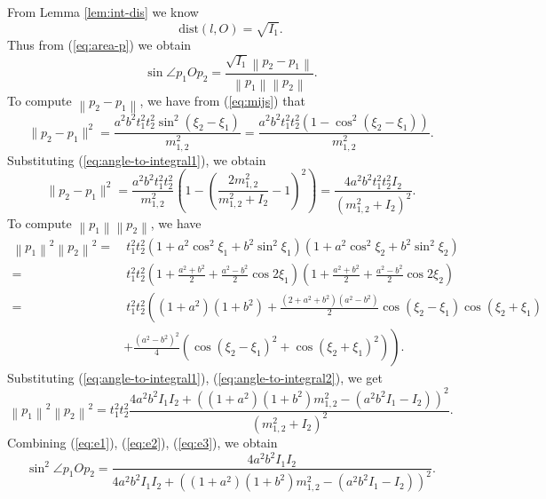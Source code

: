 \documentclass[12pt]{article}
\begin{document}
From Lemma \ref{lem:int-dis} we know 
$$
\text{dist}(l, O) = \sqrt{I_1}.
$$
Thus from (\ref{eq:area-p}) we obtain
\begin{equation}\label{eq:e1}
  \sin \angle p_1 O p_2 
 = \frac{\sqrt{I_1} \left\|p_2-p_1\right\| }{ \left\|p_1\right\| \left\| p_2\right\|}.
\end{equation}
To compute $\left\|p_2-p_1\right\|$,
we have from (\ref{eq:mijs}) that 
$$
\|p_2-p_1\|^2 = \frac{a^2 b^2 t_1^2 t_2^2 \sin^2\left(\xi_2 - \xi_1\right)}{m_{1,2}^2} = 
\frac{a^2 b^2 t_1^2 t_2^2 \left(1 - \cos^2\left(\xi_2 - \xi_1\right)\right)}{m_{1,2}^2}.
$$
Substituting (\ref{eq:angle-to-integral1}), we obtain
\begin{equation}\label{eq:e2}
\|p_2-p_1\|^2 = \frac{a^2 b^2 t_1^2 t_2^2}{m_{1,2}^2} \left( 1 - \left( \frac{2 m_{1,2}^2}{m_{1,2}^2 + I_2} - 1 \right)^2 \right)
= \frac{4 a^2 b^2 t_1^2 t_2^2 I_2}{\left(m_{1,2}^2 + I_2\right)^2}.
\end{equation}
To compute $\left\|p_1\right\|\left\|p_2\right\|$, we have 
\begin{equation*}
  \begin{split}
    \left\|p_1\right\|^2 \left\| p_2\right\|^2 
= & \ 
t_1^2 t_2^2 \left(1+a^2\cos^2 \xi_1 + b^2 \sin^2 \xi_1\right) \left(1+a^2 \cos^2 \xi_2 + b^2 \sin^2 \xi_2\right) 
\\
= & \ 
t_1^2 t_2^2 \left(1+ \frac{a^2 + b^2 }{2} + \frac{a^2 - b^2 }{2}\cos 2\xi_1 \right)\left(1+ \frac{a^2 + b^2 }{2} + \frac{a^2 - b^2 }{2}\cos 2\xi_2 \right)\\
= & \  
t_1^2 t_2^2\left((1+a^2)(1+b^2) + \frac{(2+ a^2 + b^2)(a^2 - b^2) }{2}\cos\left(\xi_2 - \xi_1\right)	\cos\left(\xi_2 + \xi_1\right) \right.
\\
& \left. + \frac{(a^2 - b^2)^2 }{4} \left(\cos\left(\xi_2 - \xi_1\right)^2 + \cos\left(\xi_2 + \xi_1\right)^2\right)\right).
  \end{split}
\end{equation*}
Substituting (\ref{eq:angle-to-integral1}), (\ref{eq:angle-to-integral2}), we get
\begin{equation}\label{eq:e3}
\left\|p_1\right\|^2 \left\| p_2\right\|^2 = t_1^2 t_2^2
\frac
{4 a^2 b^2 I_1 I_2 + \left( (1+a^2)(1+b^2) m_{1,2}^2 - ( a^2 b^2 I_1-I_2) \right)^2}
{\left(m_{1,2}^2 + I_2\right)^2}.
\end{equation}
Combining (\ref{eq:e1}), (\ref{eq:e2}), (\ref{eq:e3}), we obtain 
$$
\sin^2\angle p_1 O p_2  =  \frac {4 a^2 b^2 I_1 I_2}
{4 a^2 b^2 I_1 I_2 + \left( (1+a^2)(1+b^2) m_{1,2}^2 - ( a^2 b^2 I_1-I_2) \right)^2}.
$$
\end{document}
